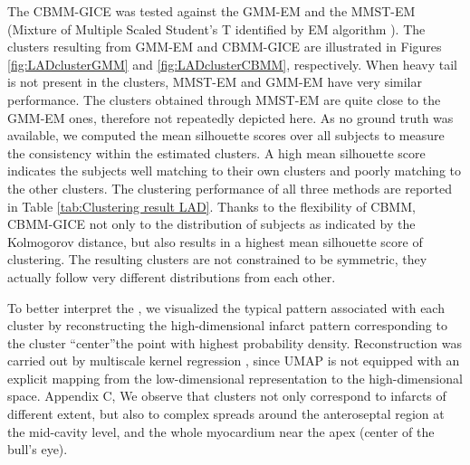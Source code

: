 The CBMM-GICE was tested against the GMM-EM and the MMST-EM (Mixture of Multiple Scaled Student's T identified by EM algorithm \cite{forbes2014new, zheng2020characterization}). The clusters resulting from GMM-EM and CBMM-GICE are illustrated in Figures \ref{fig:LADclusterGMM} and \ref{fig:LADclusterCBMM}, respectively. 
When heavy tail is not present in the clusters, MMST-EM and GMM-EM have very similar performance. 
The clusters obtained through MMST-EM are quite close to the GMM-EM ones, therefore not repeatedly depicted here. 
As no ground truth was available, we computed the mean silhouette scores \cite{rousseeuw1987silhouettes} over all subjects to measure the consistency within the estimated clusters. A high mean silhouette score indicates the subjects well matching 
to their own clusters and poorly matching to the other clusters. 
The clustering performance of all three methods are reported in Table \ref{tab:Clustering result LAD}. Thanks to the flexibility of CBMM, CBMM-GICE not only  to the distribution of subjects as indicated by the Kolmogorov distance, but also results in a highest mean silhouette score of clustering. The resulting clusters are not constrained to be symmetric, they actually follow very different distributions from each other. 

\begin{table}[b]
    \centering
    \caption{Evaluation of the clustering quality on patients with LAD infarcts, for GMM-EM, MMST-EM and CBMM-GICE ( $T$=50, , 100  iterations, ).}
    \label{tab:Clustering result LAD}
\end{table}

To better interpret the , we visualized the typical pattern associated with each cluster by reconstructing the high-dimensional infarct pattern corresponding to the cluster ``center''the point with highest probability density. Reconstruction was carried out by multiscale kernel regression \cite{duchateau2013adaptation}, since UMAP is not equipped with an explicit mapping from the low-dimensional representation to the high-dimensional space. 
Appendix C, 
We observe that clusters not only correspond to infarcts of different extent, but also to complex spreads around the anteroseptal region at the mid-cavity level, and the whole myocardium near the apex (center of the bull's eye).

